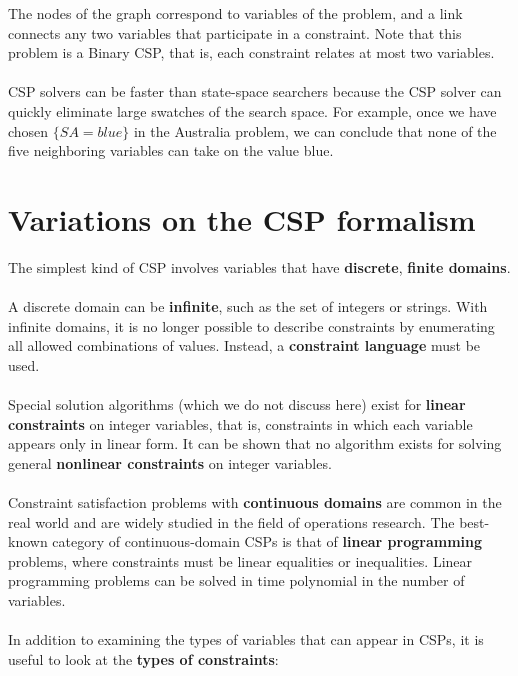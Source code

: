 The nodes of the graph correspond to variables of the problem, and a link connects any two variables that participate in a constraint. Note that this problem is a Binary CSP, that is, each constraint relates at most two variables.\\\\
CSP solvers can be faster than state-space searchers because the CSP solver can quickly eliminate large swatches of the search space. For example, once we have
chosen $\{SA = blue\}$ in the Australia problem, we can conclude that none of the five neighboring variables can take on the value blue. 

\section{Variations on the CSP formalism}
The simplest kind of CSP involves variables that have \textbf{discrete}, \textbf{finite domains}. 
\\\\
A discrete domain can be \textbf{infinite}, such as the set of integers or strings. With infinite domains, it is no longer possible to describe constraints by enumerating all allowed combinations of values. Instead, a \textbf{constraint language} must be used.
\\\\
Special solution algorithms (which we do not discuss here) exist for \textbf{linear constraints} on integer variables, that is, constraints in which each variable appears only in linear form. It can be shown that no algorithm exists for solving general \textbf{nonlinear constraints} on integer variables.  
\\\\
Constraint satisfaction problems with \textbf{continuous domains} are common in the real world and are widely studied in the field of operations research. The best-known category of continuous-domain CSPs is that of \textbf{linear programming} problems, where constraints must be linear equalities or inequalities. Linear programming problems can be solved in time polynomial in the number of variables.\\\\
In addition to examining the types of variables that can appear in CSPs, it is useful to look at the \textbf{types of constraints}:
